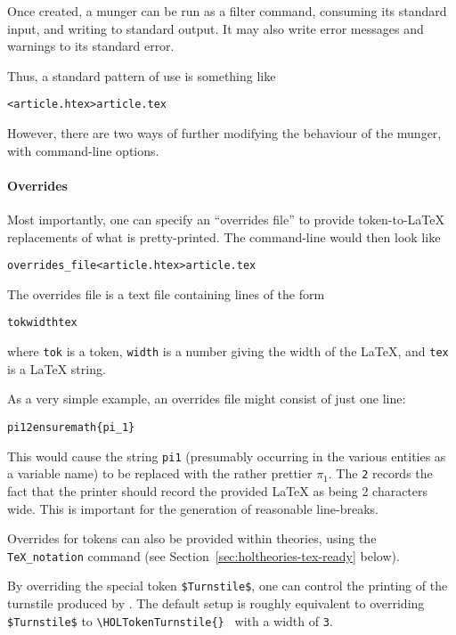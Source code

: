 Once created, a munger can be run as a filter command, consuming its
standard input, and writing to standard output.
%
It may also write error messages and warnings to its standard error.

Thus, a standard pattern of use is something like
\begin{alltt}
   \munge < article.htex > article.tex
\end{alltt}

However, there are two ways of further modifying the behaviour of the
munger, with command-line options.

\paragraph{Overrides}
Most importantly, one can specify an ``overrides file'' to provide
token-to-\LaTeX{} replacements of what is pretty-printed.
%
The command-line would then look like
\begin{alltt}
   \munge overrides_file < article.htex > article.tex
\end{alltt}
The overrides file is a text file containing lines of the form
\begin{alltt}
   tok width tex
\end{alltt}
where \texttt{tok} is a \HOL{} token, \texttt{width} is a number
giving the width of the \LaTeX{}, and \texttt{tex} is a \LaTeX{}
string.

As a very simple example, an overrides file might consist of just one
line:
\begin{alltt}
   pi1 2 \bs{}ensuremath\{\bs{}pi_1\}
\end{alltt}
This would cause the string \texttt{pi1} (presumably occurring in the
various \HOL{} entities as a variable name) to be replaced with the
rather prettier $\pi_1$.
%
The \texttt{2} records the fact that the
printer should record the provided \LaTeX{} as being 2 characters
wide.
%
This is important for the generation of reasonable line-breaks.

Overrides for \HOL{} tokens can also be provided within \HOL{}
theories, using the
\texttt{TeX\_notation} command (see
Section~\ref{sec:holtheories-tex-ready} below).

By overriding the special token \texttt{\$Turnstile\$}, one can control the printing of the turnstile produced by \holthm{}.
The default setup is roughly equivalent to overriding \texttt{\$Turnstile\$} to \texttt{\textbackslash{}HOLTokenTurnstile\{\} } with a width of \texttt{3}.

